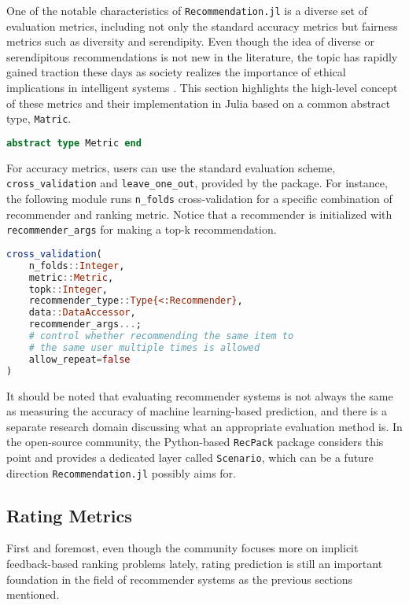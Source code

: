 One of the notable characteristics of \texttt{Recommendation.jl} is a diverse set of evaluation metrics, including not only the standard accuracy metrics but fairness metrics such as diversity and serendipity. Even though the idea of diverse or serendipitous recommendations is not new in the literature, the topic has rapidly gained traction these days as society realizes the importance of ethical implications in intelligent systems \cite{milano2020recommender}. This section highlights the high-level concept of these metrics and their implementation in Julia based on a common abstract type, \texttt{Matric}.

\begin{lstlisting}[language = Julia]
abstract type Metric end
\end{lstlisting}  

For accuracy metrics, users can use the standard evaluation scheme, \texttt{cross\_validation} and \texttt{leave\_one\_out}, provided by the package. For instance, the following module runs \texttt{n\_folds} cross-validation for a specific combination of recommender and ranking metric. Notice that a recommender is initialized with \texttt{recommender\_args} for making a top-k recommendation.

\begin{lstlisting}[language = Julia]
cross_validation(
    n_folds::Integer, 
    metric::Metric, 
    topk::Integer, 
    recommender_type::Type{<:Recommender}, 
    data::DataAccessor, 
    recommender_args...; 
    # control whether recommending the same item to 
    # the same user multiple times is allowed
    allow_repeat=false
)
\end{lstlisting}

It should be noted that evaluating recommender systems is not always the same as measuring the accuracy of machine learning-based prediction, and there is a separate research domain discussing what an appropriate evaluation method is. In the open-source community, the Python-based \texttt{RecPack} package \cite{michiels2022recpack} considers this point and provides a dedicated layer called \texttt{Scenario}, which can be a future direction \texttt{Recommendation.jl} possibly aims for.

\subsection{Rating Metrics}
\label{sec:rating-metrics}

First and foremost, even though the community focuses more on implicit feedback-based ranking problems lately, rating prediction is still an important foundation in the field of recommender systems as the previous sections mentioned.

